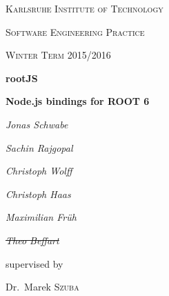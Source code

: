 \begin{titlepage}
	\centering
	{\scshape\LARGE Karlsruhe Institute of Technology \par}
	\vspace{1cm}
	{\scshape\Large Software Engineering Practice\par}
	\vspace{0.5cm}
	{\scshape\large Winter Term 2015/2016\par}

	\vspace{1.5cm}
	{\Huge\bfseries rootJS\par}
	\vspace{0.25cm}
	{\Large\bfseries Node.js bindings for ROOT 6\par}
	\vspace{2cm}
	{\Large\itshape Jonas Schwabe\par}
	{\Large\itshape Sachin Rajgopal\par}
	{\Large\itshape Christoph Wolff\par}
	{\Large\itshape Christoph Haas\par}
	{\Large\itshape Maximilian Fr\"uh\par}
	{\Large\itshape \sout{Theo Beffart}\par}
	
	\vfill
	supervised by\par
	Dr.~Marek \textsc{Szuba}
	
	\vfill
	
	{\large \date{30.11.2015}\par}
\end{titlepage}
